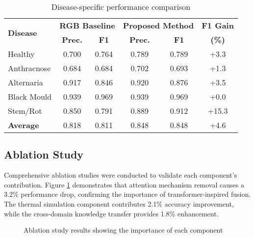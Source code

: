 \documentclass[conference]{IEEEtran}
\begin{document}
\begin{table}[!t]
    \caption{Disease-specific performance comparison}
    \label{tab:perclass}
    \raggedright
    \scriptsize
    \begin{tabular}{lccccc}
        \toprule
        \multirow{2}{*}{\textbf{Disease}} & \multicolumn{2}{c}{\textbf{RGB Baseline}} & \multicolumn{2}{c}{\textbf{Proposed Method}} & \textbf{F1 Gain} \\
        \cmidrule(lr){2-3} \cmidrule(lr){4-5}
         & \textbf{Prec.} & \textbf{F1} & \textbf{Prec.} & \textbf{F1} & \textbf{(\%)} \\
        \midrule
        Healthy & 0.700 & 0.764 & 0.789 & 0.789 & +3.3 \\
        Anthracnose & 0.684 & 0.684 & 0.702 & 0.693 & +1.3 \\
        Alternaria & 0.917 & 0.846 & 0.920 & 0.876 & +3.5 \\
        Black Mould & 0.939 & 0.969 & 0.939 & 0.969 & +0.0 \\
        Stem/Rot & 0.850 & 0.791 & 0.889 & 0.912 & +15.3 \\
        \midrule
        \textbf{Average} & 0.818 & 0.811 & 0.848 & 0.848 & +4.6 \\
        \bottomrule
    \end{tabular}
\end{table}

\subsection{Ablation Study}

Comprehensive ablation studies were conducted to validate each component's contribution. Figure \ref{fig:ablation} demonstrates that attention mechanism removal causes a 3.2\% performance drop, confirming the importance of transformer-inspired fusion. The thermal simulation component contributes 2.1\% accuracy improvement, while the cross-domain knowledge transfer provides 1.8\% enhancement.

\begin{figure}[!t]
    \raggedright
    \caption{Ablation study results showing the importance of each component}
    \label{fig:ablation}
\end{figure}
\end{document}
